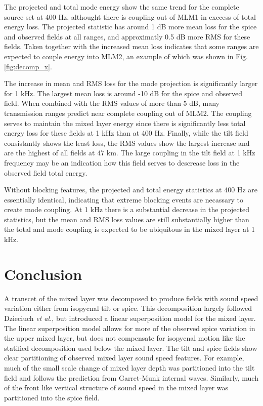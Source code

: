 \documentclass[preprint,NumberedRefs]{JASA}
\begin{document}
The projected and total mode energy show the same trend for the complete source set at 400 Hz, althought there is coupling out of MLM1 in exccess of total energy loss. The projected statistic has around 1 dB more mean loss for the spice and observed fields at all ranges, and approximatly 0.5 dB more RMS for these fields. Taken together with the increased mean loss indicates that some ranges are expected to couple energy into MLM2, an example of which was shown in Fig. \ref{fig:decomp_x}.

The increase in mean and RMS loss for the mode projection is significantly larger for 1 kHz. The largest mean loss is around -10 dB for the spice and observed field. When combined with the RMS values of more than 5 dB, many transmission ranges predict near complete coupling out of MLM2. The coupling serves to maintain the mixed layer energy since there is significantly less total energy loss for these fields at 1 kHz than at 400 Hz. Finally, while the tilt field consistantly shows the least loss, the RMS values show the largest increase and are the highest of all fields at 47 km. The large coupling in the tilt field at 1 kHz frequency may be an indication how this field serves to descrease loss in the observed field total energy.

Without blocking features, the projected and total energy statistics at 400 Hz are essentially identical, indicating that extreme blocking events are necassary to create mode coupling. At 1 kHz there is a substantial decrease in the projected statistics, but the mean and RMS loss values are still substantially higher than the total and mode coupling is expected to be ubiquitous in the mixed layer at 1 kHz.

\section{Conclusion}\label{sec:conclusion}
A transcet of the mixed layer was decomposed to produce fields with sound speed variation either from isopycnal tilt or spice. This decomposition largely followed Dzieciuch \emph{et al.}\citep{dzieciuch2004}, but introduced a linear superposition model for the mixed layer. The linear superposition model allows for more of the observed spice variation in the upper mixed layer, but does not compensate for isopycnal motion like the statified decomposition used below the mixed layer. The tilt and spice fields show clear partitioning of observed mixed layer sound speed features. For example, much of the small scale change of mixed layer depth was partitioned into the tilt field and follows the prediction from Garret-Munk internal waves. Similarly, much of the front like vertical structure of sound speed in the mixed layer was partitioned into the spice field.
\end{document}
